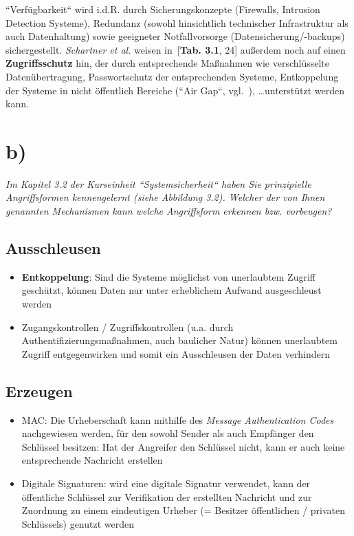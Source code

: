 \noindent
``Verfügbarkeit`` wird i.d.R. durch Sicherungskonzepte (Firewalls, Intrusion Detection Systeme), Redundanz (sowohl hinsichtlich technischer Infrastruktur als auch Datenhaltung) sowie geeigneter Notfallvorsorge (Datensicherung/-backups) sichergestellt.
\textit{Schartner et al.} weisen in~\cite{HKRS+14}[\textbf{Tab. 3.1}, 24] außerdem noch auf einen \textbf{Zugriffsschutz} hin, der durch entsprechende Maßnahmen wie verschlüsselte Datenübertragung, Passwortschutz der entsprechenden Systeme, Entkoppelung der Systeme in nicht öffentlich Bereiche (``Air Gap``, vgl.~\cite{RFC4949}), \ldots unterstützt werden kann.

\section{b)}

\noindent
\textit{Im Kapitel 3.2 der Kurseinheit ``Systemsicherheit`` haben Sie prinzipielle Angriffsformen kennengelernt (siehe Abbildung 3.2).
Welcher der von Ihnen genannten Mechanismen kann welche Angriffsform erkennen bzw. vorbeugen?
}

\subsection*{Ausschleusen}
\begin{itemize}
    \itemsep0.5em
    \item \textbf{Entkoppelung}: Sind die Systeme möglichst von unerlaubtem Zugriff geschützt, können Daten nur unter erheblichem Aufwand ausgeschleust werden
    \item Zugangskontrollen / Zugriffskontrollen (u.a. durch Authentifizierungsmaßnahmen, auch baulicher Natur) können unerlaubtem Zugriff entgegenwirken und somit ein Ausschleusen der Daten verhindern
\end{itemize}

\subsection*{Erzeugen}
\begin{itemize}
    \itemsep0.5em
    \item {MAC}: Die Urheberschaft kann mithilfe des \textit{Message Authentication Codes} nachgewiesen werden, für den sowohl Sender als auch Empfänger den Schlüssel besitzen: Hat der Angreifer den Schlüssel nicht, kann er auch keine entsprechende Nachricht erstellen
    \item {Digitale Signaturen}: wird eine digitale Signatur verwendet, kann der öffentliche Schlüssel zur Verifikation der erstellten Nachricht und zur Zuordnung zu einem eindeutigen Urheber (= Besitzer öffentlichen / privaten Schlüssels) genutzt werden
\end{itemize}


